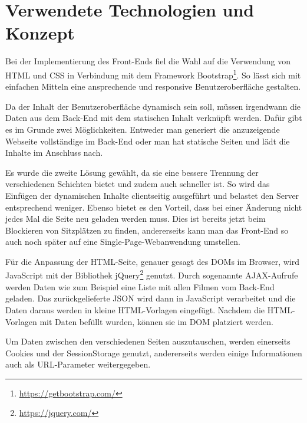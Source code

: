 \section{Verwendete Technologien und Konzept}

Bei der Implementierung des Front-Ends fiel die Wahl auf die Verwendung von \acs{HTML} und \acs{CSS} in Verbindung mit dem Framework Bootstrap\footnote{\url{https://getbootstrap.com/}}.
So lässt sich mit einfachen Mitteln eine ansprechende und responsive Benutzeroberfläche gestalten.

Da der Inhalt der Benutzeroberfläche dynamisch sein soll, müssen irgendwann die Daten aus dem Back-End mit dem statischen Inhalt verknüpft werden.
Dafür gibt es im Grunde zwei Möglichkeiten.
Entweder man generiert die anzuzeigende Webseite vollständige im Back-End oder man hat statische Seiten und lädt die Inhalte im Anschluss nach.

Es wurde die zweite Lösung gewählt, da sie eine bessere Trennung der verschiedenen Schichten bietet und zudem auch schneller ist.
So wird das Einfügen der dynamischen Inhalte clientseitig ausgeführt und belastet den Server entsprechend weniger.
Ebenso bietet es den Vorteil, dass bei einer Änderung nicht jedes Mal die Seite neu geladen werden muss.
Dies ist bereits jetzt beim Blockieren von Sitzplätzen zu finden, andererseits kann man das Front-End so auch noch später auf eine Single-Page-Webanwendung umstellen.

Für die Anpassung der \acs{HTML}-Seite, genauer gesagt des \acs{DOM}s im Browser, wird Java\-Script mit der Bibliothek jQuery\footnote{\url{https://jquery.com/}} genutzt.
Durch sogenannte \acs{AJAX}-Aufrufe werden Daten wie zum Beispiel eine Liste mit allen Filmen vom Back-End geladen.
Das zurückgelieferte \acs{JSON} wird dann in JavaScript verarbeitet und die Daten daraus werden in kleine \acs{HTML}-Vorlagen eingefügt.
Nachdem die \acs{HTML}-Vorlagen mit Daten befüllt wurden, können sie im \acs{DOM} platziert werden.

Um Daten zwischen den verschiedenen Seiten auszutauschen, werden einerseits Cookies und der SessionStorage genutzt, andererseits werden einige Informationen auch als \acs{URL}-Parameter weitergegeben.
